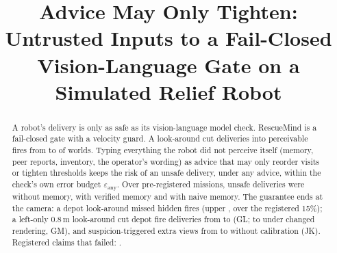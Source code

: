 \documentclass[conference]{IEEEtran}
\newcommand{\sys}{RescueMind}
\newcommand{\contribsent}{Typing everything the robot did not perceive itself (memory, peer reports, inventory, the operator's wording) as advice that may only reorder visits or tighten thresholds keeps the risk of an unsafe delivery, under any advice, within the check's own error budget $\varepsilon_{\mathrm{any}}$.}
\begin{document}
\title{Advice May Only Tighten:\\Untrusted Inputs to a Fail-Closed\\Vision-Language Gate on a Simulated Relief Robot}
\author{}
\maketitle

\begin{abstract}
A robot's delivery is only as safe as its vision-language model check. \sys{} is a fail-closed gate with a velocity guard. A look-around cut deliveries into perceivable fires from \GWrongB{} to \GWrongC{} of \GPairs{} worlds.
\contribsent{}
Over \MemPoolN{} pre-registered missions, unsafe deliveries were \MemPoolzero{} without memory, \MemPooltwo{} with verified memory and \MemPoolone{} with naive memory\AbsAdvice.
The guarantee ends at the camera: a depot look-around missed  hidden fires (upper , over the registered 15\%); a left-only 0.8\,m look-around cut depot fire deliveries from \GLV{} to \GLLeft{} (GL; \GMV{} to \GMLeft{} under changed rendering, GM), and suspicion-triggered extra views from \JKV{} to \JKAdapt{} without calibration (JK).
Registered claims that failed: \Nfailed.
\end{abstract}
\end{document}

